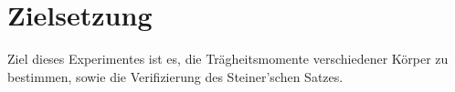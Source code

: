 \section{Zielsetzung}
\label{sec:Zielsetzung}
Ziel dieses Experimentes ist es, die Trägheitsmomente verschiedener Körper zu bestimmen, sowie die Verifizierung des Steiner'schen Satzes. 